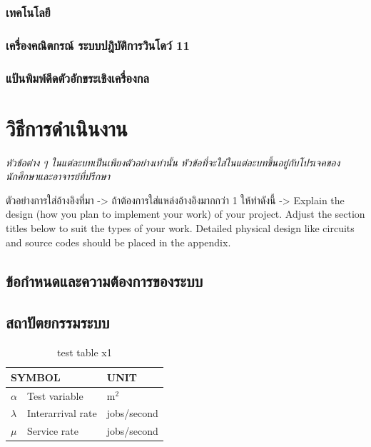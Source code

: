 \documentclass[12pt,oneside,openright,a4paper]{cpe-thai-project}
\begin{document}
    \subsection{เทคโนโลยี}
        \subsection{เครื่องคณิตกรณ์ ระบบปฎิบัติการวินโดว์ 11}
        \subsection{แป้นพิมพ์ดีดตัวอักขระเชิงเครื่องกล}

\chapter{วิธีการดำเนินงาน}

\emph{หัวข้อต่าง ๆ ในแต่ละบทเป็นเพียงตัวอย่างเท่านั้น หัวข้อที่จะใส่ในแต่ละบทขึ้นอยู่กับโปรเจคของนักศึกษาและอาจารย์ที่ปรึกษา}


ตัวอย่างการใส่อ้างอิงที่มา -> \cite{hypersense} ถ้าต้องการใส่แหล่งอ้างอิงมากกว่า 1 ให้ทำดังนี้ -> \cite{hypersense,bworld} 
Explain the design (how you plan to implement your work) of your project. Adjust the section titles below to suit the types of your work. Detailed physical design like circuits and source codes should be placed in the appendix.

\section{ข้อกำหนดและความต้องการของระบบ}

\section{สถาปัตยกรรมระบบ}

    \begin{table}[!h]
        \centering
            \caption{test table x1}\label{tbl:symbols}
            \begin{tabular}{@{}p{}|p{}p{}}\hline
                \multicolumn{2}{l}{\textbf{SYMBOL}}  & \textbf{UNIT} \\ \hline 
                $\alpha$ & Test variable\hfill & m$^2$ \\
                $\lambda$ & Interarrival rate\hfill &  jobs/second\\
                $\mu$ & Service rate\hfill & jobs/second \\ \hline
            \end{tabular}
    \end{table}
\end{document}
